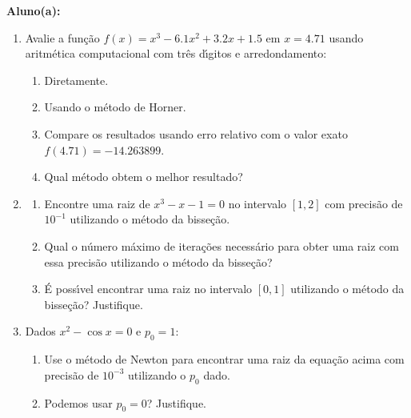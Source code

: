 \documentclass[a4paper,5pt]{amsbook}
\begin{document}
\vspace{0.5cm}
{\bf Aluno(a):}\dotfill{}  %

\vspace{0.2cm}
\begin{enumerate}
	\vspace{0.5cm}

	\item Avalie a fun\c{c}\~ao $f(x) = x^3 - 6.1x^2 + 3.2x + 1.5$ em $x = 4.71$ usando
		aritm\'etica computacional com tr\^es d\'{\i}gitos e arredondamento:
		\begin{enumerate}
			\item Diretamente.
			\item Usando o m\'etodo de Horner.
			\item Compare os resultados usando erro relativo com o valor exato
				$f(4.71) = -14.263899$.
			\item Qual m\'etodo obtem o melhor resultado?
		\end{enumerate}
	\vspace{0.5cm}

	\item
		\begin{enumerate}
			\item Encontre uma raiz de $x^3 - x - 1 = 0$ no intervalo $[1,2]$
				com precis\~ao de $10^{-1}$ utilizando o m\'etodo da bisse\c{c}\~ao.
			\item Qual o n\'umero m\'aximo de itera\c{c}\~oes necess\'ario para obter uma
				raiz com essa precis\~ao utilizando o m\'etodo da bisse\c{c}\~ao?
			\item \'{E} poss\'{\i}vel encontrar uma raiz no intervalo $[0,1]$ utilizando
				o m\'etodo da bisse\c{c}\~ao? Justifique.
		\end{enumerate}
	\vspace{0.5cm}

	\item Dados $x^2 - \cos{x} = 0$ e $p_0 = 1$:
		\begin{enumerate}
			\item Use o m\'etodo de Newton para encontrar uma raiz da equa\c{c}\~ao
				acima com precis\~ao de $10^{-3}$ utilizando o $p_0$ dado.
			\item Podemos usar $p_0 = 0$? Justifique.
		\end{enumerate}
	\vspace{0.5cm}


\end{enumerate}
\end{document}
